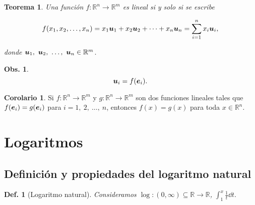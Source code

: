 \documentclass{article}
\theoremstyle{definicion}
\newtheorem{definicion}{Def.}
\theoremstyle{definition}             %
\theoremstyle{definition}             %
\theoremstyle{definition}
\theoremstyle{definition}
\theoremstyle{observacion}
\newtheorem{obs}{Obs.}
\theoremstyle{definition}
\theoremstyle{plain}
\newtheorem{theorem}{Teorema}
\theoremstyle{definition}
\theoremstyle{afirmacion}
\newtheorem{corollary}{Corolario}
\theoremstyle{definition}
\begin{document}
    \begin{theorem}
        Una función \(f \colon \mathbb{R}^{n} \to \mathbb{R}^{m}\) es lineal si y solo si se escribe

        \begin{equation*}
            f(x_{1}, x_{2}, \dots, x_{n}) = x_{1}\vb*{u}_{1} + x_{2}\vb*{u}_{2} + \cdots + x_{n}\vb*{u}_{n} = \sum_{i = 1}^{n} x_{i} \vb*{u}_{i},
        \end{equation*}

        donde \(\vb*{u}_{1},\ \vb*{u}_{2},\ \dots,\ \vb*{u}_{n}\in\mathbb{R}^{m}\).
    \end{theorem}

    \begin{obs}
        \begin{equation*}
            \vb*{u}_{i} = f(\vb*{e}_{i}).
        \end{equation*}
    \end{obs}

    \begin{corollary}
        Si \(f \colon \mathbb{R}^{n} \to \mathbb{R}^{m}\) y \(g \colon \mathbb{R}^{n} \to \mathbb{R}^{m}\) son dos funciones lineales tales que \(f(\vb*{e}_{i}) = g(\vb*{e}_{i})\) para \(i = 1,\ 2,\ \dots,\ n\), entonces \(f(x) = g(x)\) para toda \(x\in\mathbb{R}^{n}\).
    \end{corollary}

    \section{Logaritmos}
    \subsection{Definición y propiedades del logaritmo natural}

    \begin{definicion}[Logaritmo natural]   
        Consideramos \(\log \colon (0, \infty) \subseteq \mathbb{R} \to \mathbb{R}\), \(\int_{1}^{x}\frac{1}{t}\dd{t}.\)
    \end{definicion}
\end{document}
